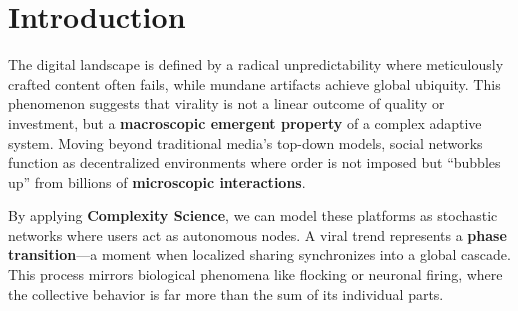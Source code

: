 \documentclass[12pt]{article}
\begin{document}
\newpage
{} %

\begin{abstract}

\noindent \textbf{This paper explores viral trend propagation on social networks through the lens of complexity science.} By modeling users as nodes in a stochastic network and meme spread as a probabilistic contagion process, we demonstrate the emergence of avalanche-like behavior. 

\vspace{0.8cm} %

\noindent The system exhibits power-law distributions and characteristics of self-organized criticality (SOC). The role of connectivity and influencers in shaping virality is also analyzed.
\end{abstract}

\vfill %

\section{\Large Introduction} %


The digital landscape is defined by a radical unpredictability where meticulously crafted content often fails, while mundane artifacts achieve global ubiquity. This phenomenon suggests that virality is not a linear outcome of quality or investment, but a \textbf{macroscopic emergent property} of a complex adaptive system. Moving beyond traditional media’s top-down models, social networks function as decentralized environments where order is not imposed but ``bubbles up'' from billions of \textbf{microscopic interactions}.

\vspace{0.6cm} %

By applying \textbf{Complexity Science}, we can model these platforms as stochastic networks where users act as autonomous nodes. A viral trend represents a \textbf{phase transition}---a moment when localized sharing synchronizes into a global cascade. This process mirrors biological phenomena like flocking or neuronal firing, where the collective behavior is far more than the sum of its individual parts.
\end{document}
